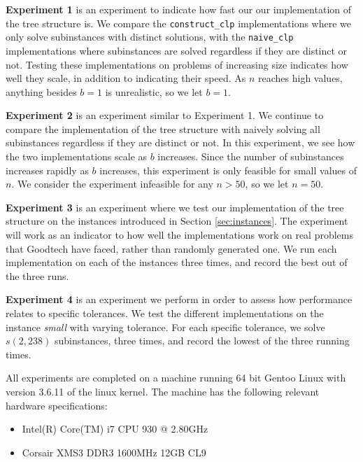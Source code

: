 \textbf{Experiment 1} is an experiment to indicate how fast our
our implementation of the tree structure is. We compare the
\texttt{construct\_clp} implementations where we only solve subinstances
with distinct solutions, with the \texttt{naive\_clp} implementations where
subinstances are solved regardless if they are distinct or not. Testing these
implementations on problems of increasing size indicates how well they scale,
in addition to indicating their speed. 
As $n$ reaches high values, anything besides $b = 1$ is unrealistic, so we
let $b = 1$.

\textbf{Experiment 2} is an experiment similar to Experiment 1. We continue
to compare the implementation of the tree structure with naively solving all
subinstances regardless if they are distinct or not. In this experiment, we
see how the two implementations scale as $b$ increases. Since the number
of subinstances increases rapidly as $b$ increases, this experiment is only
feasible for small values of $n$. We consider the experiment infeasible for
any $n > 50$, so we let $n = 50$.

\textbf{Experiment 3} is an experiment where we test our implementation of the
tree structure on the instances introduced in Section \ref{sec:instances}.
The experiment will work as an indicator to how well the implementations work
on real problems that Goodtech have faced, rather than randomly generated one.
We run each implementation on each of the instances three times, and record
the best out of the three runs.

\textbf{Experiment 4} is an experiment we perform in order to assess
how performance relates to specific tolerances. We test the different
implementations on the instance \textit{small} with varying tolerance.
For each specific tolerance, we solve $s(2, 238)$ subinstances, three times,
and record the lowest of the three running times.

All experiments are completed on a machine running 64 bit Gentoo Linux
with version 3.6.11 of the linux kernel. The machine has the following
relevant hardware specifications:
\begin{itemize}
    \item Intel(R) Core(TM) i7 CPU 930 @ 2.80GHz
    \item Corsair XMS3 DDR3 1600MHz 12GB CL9
\end{itemize}
